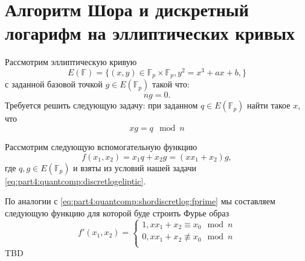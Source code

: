 \section{Алгоритм Шора и дискретный логарифм на эллиптических кривых} 
Рассмотрим эллиптическую кривую 
\[
E\left(\mathbb{F}\right) = \{
(x,y) \in \mathbb{F}_p \times \mathbb{F}_p, y^2 = x^3 +a x + b,
\}
\]
с заданной базовой точкой $g \in E\left(\mathbb{F}_p\right)$ такой что: 
\[
n g = 0.
\]
Требуется решить следующую задачу: при заданном $q
\in E\left(\mathbb{F}_p\right)$ найти такое $x$, что
\begin{equation}
x g = q \mod n
\label{eq:part4:quantcomp:discretlogeliptic}
\end{equation}

Рассмотрим следующую вспомогательную функцию
\[
f(x_1, x_2) = x_1 q + x_2 g = \left(x x_1 + x_2\right) g,
\]
где $q,g \in E\left(\mathbb{F}_p\right)$ и взяты из условий нашей
задачи \eqref{eq:part4:quantcomp:discretlogeliptic}. 

По аналогии с \eqref{eq:part4:quantcomp:shordiscretlog:fprime} мы
составляем следующую функцию для которой буде строить Фурье образ 
\begin{equation}
\label{eq:part4:quantcomp:shorelliptic:fprime}
f'\left(x_1, x_2\right) = 
\begin{cases}
1, x x_1 + x_2 \equiv x_0 \mod n \\
0, x x_1 + x_2 \not\equiv x_0 \mod n \\
\end{cases}
\end{equation}
TBD
